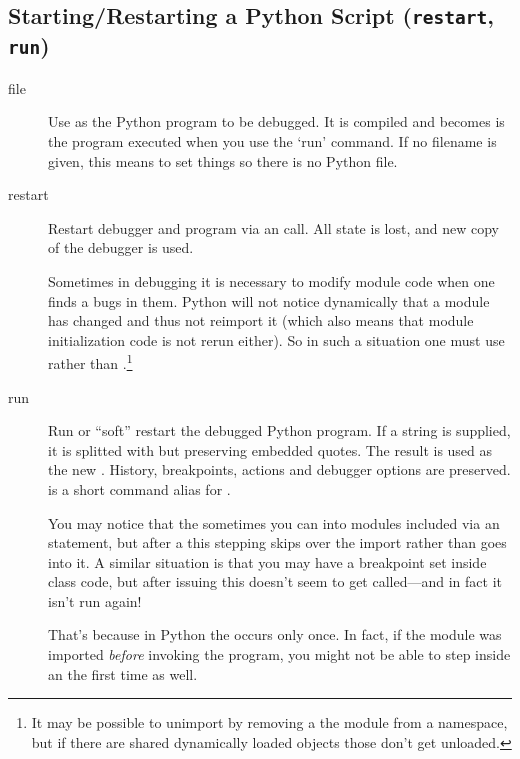 \subsection{Starting/Restarting a Python Script ({\tt restart}, {\tt run})\label{subsection-restart}}

\begin{description}

\item[file \label{command:file}]

Use  as the Python program to be debugged.
It is compiled and becomes is the program executed when you use the `run'
command.  If no filename is given, this means to set things so there
is no Python file.

\item[restart ]\label{command:restart}

Restart debugger and program via an  call. All state
is lost, and new copy of the debugger is used.

Sometimes in debugging it is necessary to modify module code when one
finds a bugs in them. Python will not notice dynamically that a module
has changed and thus not reimport it (which also means that module
initialization code is not rerun either). So in such a situation one
must use  rather than .\footnote{It may be
possible to unimport by removing a the module from a namespace, but if
there are shared dynamically loaded objects those don't get unloaded.}

\item[run ]\label{command:run}

Run or ``soft'' restart the debugged Python program. If a string is
supplied, it is splitted with  but preserving embedded
quotes. The result is used as the new .  History,
breakpoints, actions and debugger options are preserved.   is
a short command alias for .

You may notice that the sometimes you can  into modules
included via an  statement, but after a  this
stepping skips over the import rather than goes into it. A similar
situation is that you may have a breakpoint set inside class
 code, but after issuing  this doesn't seem
to get called---and in fact it isn't run again!

That's because in Python the  occurs only once. In fact,
if the module was imported \emph{before\/} invoking the program, you
might not be able to step inside an  the first time as
well.


\end{description}
